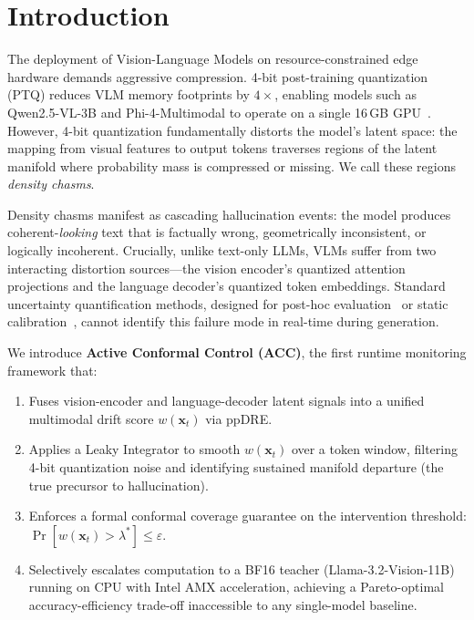 \documentclass[runningheads]{llncs}
\newcommand{\lstar}{\lambda^*}
\newcommand{\wxt}{w(\mathbf{x}_t)}
\begin{document}
\section{Introduction}
\label{sec:intro}

The deployment of Vision-Language Models on resource-constrained edge hardware
demands aggressive compression. 4-bit post-training quantization (PTQ) reduces
VLM memory footprints by $4\times$, enabling models such as Qwen2.5-VL-3B and
Phi-4-Multimodal to operate on a single 16\,GB GPU~\cite{dettmers2023qlora,
lin2023awq}. However, 4-bit quantization fundamentally distorts the model's
latent space: the mapping from visual features to output tokens traverses
regions of the latent manifold where probability mass is compressed or
missing.  We call these regions \emph{density chasms}.

Density chasms manifest as cascading hallucination events: the model produces
coherent-\emph{looking} text that is factually wrong, geometrically inconsistent,
or logically incoherent. Crucially, unlike text-only LLMs, VLMs suffer from two
interacting distortion sources---the vision encoder's quantized attention
projections and the language decoder's quantized token embeddings. Standard
uncertainty quantification methods, designed for post-hoc evaluation~\cite{
kuhn2023semantic} or static calibration~\cite{angelopoulos2024crc}, cannot
identify this failure mode in real-time during generation.

We introduce \textbf{Active Conformal Control (ACC)}, the first runtime
monitoring framework that:
\begin{enumerate}[itemsep=0pt]
  \item Fuses vision-encoder and language-decoder latent signals into a
    unified multimodal drift score $\wxt$ via ppDRE.
  \item Applies a Leaky Integrator to smooth $\wxt$ over a token window,
    filtering 4-bit quantization noise and identifying sustained
    manifold departure (the true precursor to hallucination).
  \item Enforces a formal conformal coverage guarantee on the intervention
    threshold: $\Pr[\wxt > \lstar] \leq \varepsilon$.
  \item Selectively escalates computation to a BF16 teacher (Llama-3.2-Vision-11B)
    running on CPU with Intel AMX acceleration, achieving a Pareto-optimal
    accuracy-efficiency trade-off inaccessible to any single-model baseline.
\end{enumerate}
\end{document}
